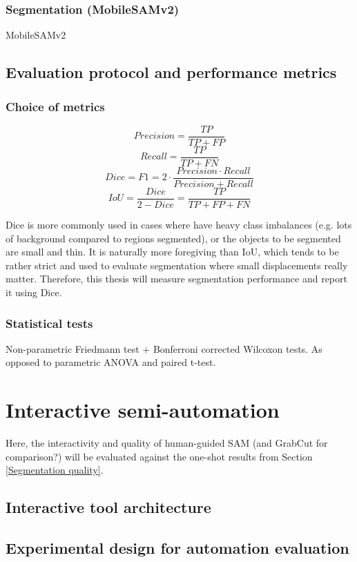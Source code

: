 \subsubsection{Segmentation (MobileSAMv2)}
MobileSAMv2 \parencite{mobile_sam_v2}

\subsection{Evaluation protocol and performance metrics}

\subsubsection{Choice of metrics}
$$ Precision = \frac{TP}{TP + FP} $$
$$ Recall = \frac{TP}{TP + FN} $$
$$ Dice = F1 = 2 \cdot \frac{Precision \cdot Recall}{Precision + Recall} $$
$$ IoU = \frac{Dice}{2 - Dice} = \frac{TP}{TP + FP + FN} $$

\acs{Dice} is more commonly used in cases where have heavy class imbalances (e.g. lots of background compared to regions segmented), or the objects to be segmented are small and thin.
It is naturally more foregiving than \acs{IoU}, which tends to be rather strict and used to evaluate segmentation where small displacements really matter.
Therefore, this thesis will measure segmentation performance and report it using \acs{Dice}.
\parencite{Metrics2025}
\subsubsection{Statistical tests}
Non-parametric Friedmann test + Bonferroni corrected Wilcoxon tests. As opposed to parametric ANOVA and paired t-test.
\parencite{Rainio2024}

\section{Interactive semi-automation}
Here, the interactivity and quality of human-guided SAM (and GrabCut for comparison?) will be evaluated against the one-shot results from Section \ref{Segmentation quality}.
\noindent{}

\subsection{Interactive tool architecture}
\subsection{Experimental design for automation evaluation}
